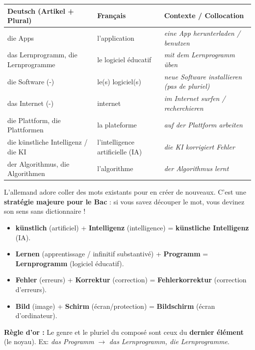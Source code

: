 \documentclass[11pt]{article}
\newcommand{\all}[1]{\ifmmode\text{\textit{#1}}\else\begingroup\selectlanguage{ngerman}\itshape #1\endgroup\fi}
\begin{document}
\begin{center}
\begin{tabularx}{\linewidth}{|X|X|X|}
\hline
\rowcolor{poppurpleL} \textbf{Deutsch (Artikel + Plural)} & \textbf{Français} & \textbf{Contexte / Collocation} \\
\hline
die Apps & l'application & \all{eine App herunterladen / benutzen} \\
das Lernprogramm, die Lernprogramme & le logiciel éducatif & \all{mit dem Lernprogramm üben} \\
die Software (-) & le(s) logiciel(s) & \all{neue Software installieren} (pas de pluriel) \\
das Internet (-) & internet & \all{im Internet surfen / recherchieren} \\
die Plattform, die Plattformen & la plateforme & \all{auf der Plattform arbeiten} \\
die künstliche Intelligenz / die KI & l'intelligence artificielle (IA) & \all{die KI korrigiert Fehler} \\
der Algorithmus, die Algorithmen & l'algorithme & \all{der Algorithmus lernt} \\
\hline
\end{tabularx}
\end{center}

\begin{savaistu}
L'allemand adore coller des mots existants pour en créer de nouveaux. C'est une \textbf{stratégie majeure pour le Bac} : si vous savez découper le mot, vous devinez son sens sans dictionnaire !
\begin{itemize}
    \item \textbf{künstlich} (artificiel) + \textbf{Intelligenz} (intelligence) = \textbf{künstliche Intelligenz} (IA).
    \item \textbf{Lernen} (apprentissage / infinitif substantivé) + \textbf{Programm} = \textbf{Lernprogramm} (logiciel éducatif).
    \item \textbf{Fehler} (erreurs) + \textbf{Korrektur} (correction) = \textbf{Fehlerkorrektur} (correction d'erreurs).
    \item \textbf{Bild} (image) + \textbf{Schirm} (écran/protection) = \textbf{Bildschirm} (écran d'ordinateur).
\end{itemize}
\textbf{Règle d'or :} Le genre et le pluriel du composé sont ceux du \textbf{dernier élément} (le noyau). Ex: \emph{das Programm} $\rightarrow$ \emph{das Lernprogramm, die Lernprogramme}.
\end{savaistu}
\end{document}
